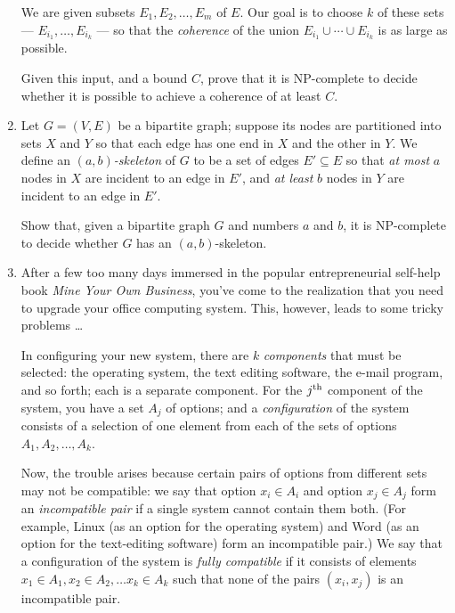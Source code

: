 \documentclass[12pt]{article}
\begin{document}
\begin{enumerate}
We are given subsets $E_1, E_2, \ldots, E_m$ of $E$.
Our goal is to choose $k$ of these sets ---
$E_{i_1}, \ldots, E_{i_k}$ --- so that the
{\em coherence} of the union
$E_{i_1} \cup \cdots \cup E_{i_k}$ is as large as possible.

Given this input, and a bound $C$, prove that it is
NP-complete to decide whether it is possible to achieve
a coherence of at least $C$.


\item 

Let $G = (V,E)$ be a bipartite graph; suppose its nodes are
partitioned into sets $X$ and $Y$ so that each edge has one end
in $X$ and the other in $Y$.  We define an {\em $(a,b)$-skeleton}
of $G$ to be a set of edges $E' \subseteq E$ so that {\em at most}
$a$ nodes in $X$ are incident to an edge in $E'$, and {\em at least}
$b$ nodes in $Y$ are incident to an edge in $E'$.

Show that, given a bipartite graph $G$ and numbers $a$ and $b$,
it is NP-complete to decide whether $G$ has an $(a,b)$-skeleton.



\item 

After a few too many days immersed in the popular
entrepreneurial self-help book {\em Mine Your Own Business},
you've come to the realization that you need
to upgrade your office computing system.
This, however, leads to some tricky problems \ldots

In configuring your new system, there are $k$
{\em components} that must be selected:
the operating system, the text editing software,
the e-mail program, and so forth; each is a separate component.
For the $j^{\rm th}$ component of the system,
you have a set $A_j$ of options;
and a {\em configuration} of the system consists
of a selection of one element from each of the
sets of options $A_1, A_2, \ldots, A_k$.

Now, the trouble arises because
certain pairs of options from different sets
may not be compatible:
we say that option $x_i \in A_i$ and option $x_j \in A_j$
form an {\em incompatible pair} if a single system
cannot contain them both.
(For example, Linux (as an option for the operating system)
and Word (as an option for the text-editing software)
form an incompatible pair.)
We say that a configuration of the system is
{\em fully compatible} if it consists of elements
$x_1 \in A_1, x_2 \in A_2, \ldots x_k \in A_k$
such that none of the pairs $(x_i,x_j)$ is
an incompatible pair.


\end{enumerate}
\end{document}
